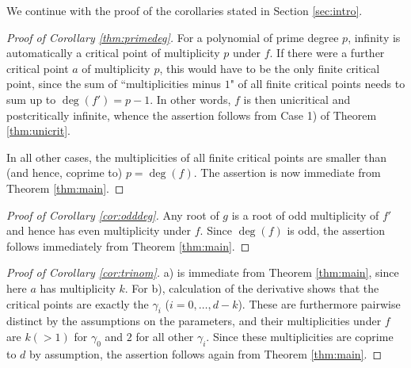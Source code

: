 \documentclass[a4paper]{amsart}
\begin{document}
 
 We continue with the proof of the corollaries stated in Section \ref{sec:intro}.
 \begin{proof}[Proof of Corollary \ref{thm:primedeg}]
 For a polynomial of prime degree $p$, infinity is automatically a critical point of multiplicity $p$ under $f$. If there were a further critical point $a$ of multiplicity $p$, this would have to be the only finite critical point, since the sum of ``multiplicities minus $1$" of all finite critical points needs to sum up to $\deg(f')=p-1$. %
In other words, $f$ is then unicritical and postcritically infinite, whence the assertion follows from Case 1) of Theorem \ref{thm:unicrit}.
 
 In all other cases, the multiplicities of all finite critical points are smaller than (and hence, coprime to) $p=\deg(f)$. The assertion is now immediate from Theorem \ref{thm:main}.
 \end{proof}

 
 \begin{proof}[Proof of Corollary \ref{cor:odddeg}]
 Any root of $g$ is a root of odd multiplicity of $f'$ and hence has even multiplicity under $f$. Since $\deg(f)$ is odd, the assertion follows immediately from Theorem \ref{thm:main}.
 \end{proof}
 
 \begin{proof}[Proof of Corollary \ref{cor:trinom}]
 a) is immediate from Theorem \ref{thm:main}, since here $a$ has multiplicity $k$. For b), calculation of the derivative shows that the critical points are exactly the $\gamma_i$ ($i=0,\dots, d-k$). These are furthermore pairwise distinct by the assumptions on the parameters, and their multiplicities under $f$ are $k(>1)$ for $\gamma_0$ and $2$ for all other $\gamma_i$. Since these multiplicities are coprime to $d$ by assumption, the assertion follows again from Theorem \ref{thm:main}.
 \end{proof}
 
 
\end{document}
